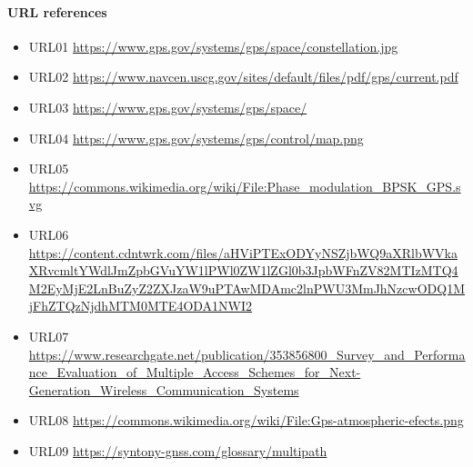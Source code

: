 \renewcommand{\listfigurename}{List of Figures}
\listoffigures
\addcontentsline{toc}{chapter}{\listfigurename} %

\paragraph{URL references}

\begin{itemize}
	\item URL01 \href{https://www.gps.gov/systems/gps/space/constellation.jpg}{https://www.gps.gov/systems/gps/space/constellation.jpg}
	\item URL02 \href{https://www.navcen.uscg.gov/sites/default/files/pdf/gps/current.pdf}{https://www.navcen.uscg.gov/sites/default/files/pdf/gps/current.pdf}
	\item URL03 \href{https://www.gps.gov/systems/gps/space/}{https://www.gps.gov/systems/gps/space/}
	\item URL04 \href{https://www.gps.gov/systems/gps/control/map.png}{https://www.gps.gov/systems/gps/control/map.png}
	\item URL05 \href{https://commons.wikimedia.org/wiki/File:Phase\_modulation\_BPSK\_GPS.svg}{https://commons.wikimedia.org/wiki/File:Phase\_modulation\_BPSK\_GPS.svg}

	\item URL06 \href{https://content.cdntwrk.com/files/aHViPTExODYyNSZjbWQ9aXRlbWVkaXRvcmltYWdlJmZpbGVuYW1lPWl0ZW1lZGl0b3JpbWFnZV82MTIzMTQ4M2EyMjE2LnBuZyZ2ZXJzaW9uPTAwMDAmc2lnPWU3MmJhNzcwODQ1MjFhZTQzNjdhMTM0MTE4ODA1NWI2}{https://content.cdntwrk.com/files/aHViPTExODYyNSZjbWQ9aXRlbWVkaXRvcmltYWdlJmZpbGVuYW1lPWl0ZW1lZGl0b3JpbWFnZV82MTIzMTQ4M2EyMjE2LnBuZyZ2ZXJzaW9uPTAwMDAmc2lnPWU3MmJhNzcwODQ1MjFhZTQzNjdhMTM0MTE4ODA1NWI2}


	\item URL07 \href{https://www.researchgate.net/publication/353856800\_Survey\_and\_Performance\_Evaluation\_of\_Multiple\_Access\_Schemes\_for\_Next-Generation\_Wireless\_Communication\_Systems}{https://www.researchgate.net/publication/353856800\_Survey\_and\_Performance\_Evaluation\_of\_Multiple\_Access\_Schemes\_for\_Next-Generation\_Wireless\_Communication\_Systems}

	\item URL08 \href{https://commons.wikimedia.org/wiki/File:Gps-atmospheric-efects.png}{https://commons.wikimedia.org/wiki/File:Gps-atmospheric-efects.png}

	\item URL09 \href{https://syntony-gnss.com/glossary/multipath}{https://syntony-gnss.com/glossary/multipath}


\end{itemize}
